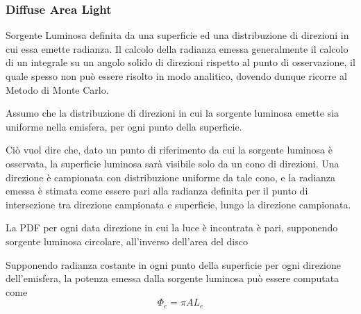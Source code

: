 \subsubsection{Diffuse Area Light}
Sorgente Luminosa definita da una superficie ed una distribuzione di direzioni in cui essa emette radianza. Il calcolo della radianza emessa 
generalmente il calcolo di un integrale su un angolo solido di direzioni rispetto al punto di osservazione, il quale spesso non pu\`o essere 
risolto in modo analitico, dovendo dunque ricorre al Metodo di Monte Carlo.\par
Assumo che la distribuzione di direzioni in cui la sorgente luminosa emette sia uniforme nella emisfera, per ogni punto della superficie.\par
Ci\`o vuol dire che, dato un punto di riferimento da cui la sorgente luminosa \`e osservata, la superficie luminosa sar\`a visibile solo da un
cono di direzioni. Una direzione \`e campionata con distribuzione uniforme da tale cono, e la radianza emessa \`e stimata come essere pari alla 
radianza definita per il punto di intersezione tra direzione campionata e superficie, lungo la direzione campionata.\par
La PDF per ogni data direzione in cui la luce \`e incontrata \`e pari, supponendo sorgente luminosa circolare, all'inverso dell'area del disco\par
Supponendo radianza costante in ogni punto della superficie per ogni direzione dell'emisfera, la potenza emessa dalla sorgente luminosa pu\`o essere 
computata come 
\begin{equation}
	\Phi_e = \pi AL_e
\end{equation}
